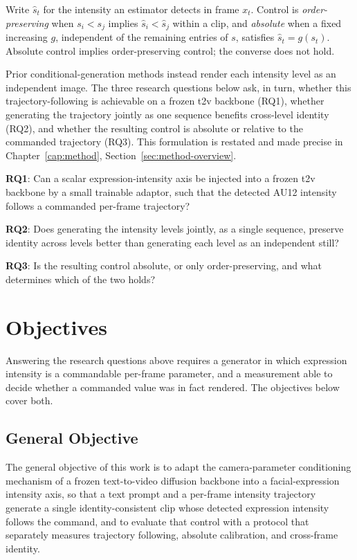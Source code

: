 Write $\hat{s}_t$ for the intensity an estimator detects in frame $x_t$. Control is
\emph{order-preserving} when $s_i<s_j$ implies $\hat{s}_i<\hat{s}_j$ within a clip, and
\emph{absolute} when a fixed increasing $g$, independent of the remaining entries of $s$,
satisfies $\hat{s}_t=g(s_t)$. Absolute control implies order-preserving control; the converse
does not hold. 

Prior conditional-generation methods instead render each intensity level as an independent image. The three research questions below ask, in turn, whether this trajectory-following is achievable on a frozen \gls{t2v} backbone (RQ1), whether generating the trajectory jointly as one sequence benefits cross-level identity (RQ2), and whether the resulting control is absolute or relative to the commanded trajectory (RQ3). This formulation is restated and made precise
in Chapter~\ref{cap:method}, Section~\ref{sec:method-overview}.

\medskip
\noindent\textbf{RQ1}: Can a scalar expression-intensity axis be injected into a frozen
\gls{t2v} backbone by a small trainable adaptor, such that the detected AU12 intensity follows a
commanded per-frame trajectory?

\noindent\textbf{RQ2}: Does generating the intensity levels jointly, as a single
sequence, preserve identity across levels better than generating each level as an
independent still?

\noindent\textbf{RQ3}: Is the resulting control absolute, or only order-preserving, and what
determines which of the two holds?

\section{Objectives}\label{sec:objectives}

Answering the research questions above requires a generator in which expression intensity is a
commandable per-frame parameter, and a measurement able to decide whether a commanded value was
in fact rendered. The objectives below cover both.

\subsection{General Objective}\label{subsec:general-objective}

The general objective of this work is to adapt the camera-parameter conditioning mechanism of a
frozen text-to-video diffusion backbone into a facial-expression intensity axis, so that a text
prompt and a per-frame intensity trajectory generate a single identity-consistent clip whose
detected expression intensity follows the command, and to evaluate that control with a protocol
that separately measures trajectory following, absolute calibration, and cross-frame identity.

